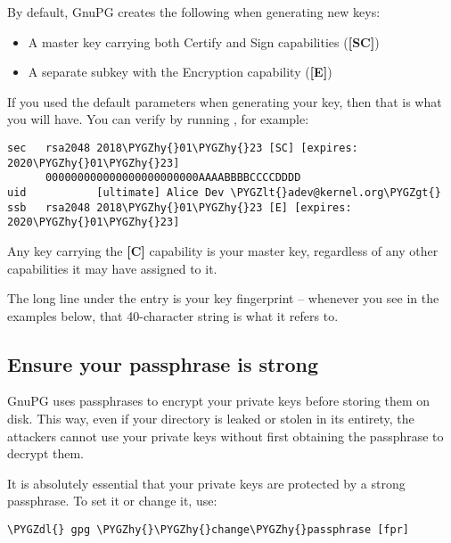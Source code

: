 \documentclass[a4paper,8pt,english]{sphinxmanual}
\def\PYGZlt{\char`\<}
\def\PYGZgt{\char`\>}
\def\PYGZdl{\char`\$}
\def\PYGZhy{\char`\-}
\begin{document}
By default, GnuPG creates the following when generating new keys:
\begin{itemize}
\item {} 
A master key carrying both Certify and Sign capabilities (\textbf{{[}SC{]}})

\item {} 
A separate subkey with the Encryption capability (\textbf{{[}E{]}})

\end{itemize}

If you used the default parameters when generating your key, then that
is what you will have. You can verify by running ,
for example:

\begin{Verbatim}[commandchars=\\\{\}]
sec   rsa2048 2018\PYGZhy{}01\PYGZhy{}23 [SC] [expires: 2020\PYGZhy{}01\PYGZhy{}23]
      000000000000000000000000AAAABBBBCCCCDDDD
uid           [ultimate] Alice Dev \PYGZlt{}adev@kernel.org\PYGZgt{}
ssb   rsa2048 2018\PYGZhy{}01\PYGZhy{}23 [E] [expires: 2020\PYGZhy{}01\PYGZhy{}23]
\end{Verbatim}

Any key carrying the \textbf{{[}C{]}} capability is your master key, regardless
of any other capabilities it may have assigned to it.

The long line under the  entry is your key fingerprint --
whenever you see \code{{[}fpr{]}} in the examples below, that 40-character
string is what it refers to.


\subsection{Ensure your passphrase is strong}
\label{process/maintainer-pgp-guide:ensure-your-passphrase-is-strong}
GnuPG uses passphrases to encrypt your private keys before storing them on
disk. This way, even if your  directory is leaked or stolen in
its entirety, the attackers cannot use your private keys without first
obtaining the passphrase to decrypt them.

It is absolutely essential that your private keys are protected by a
strong passphrase. To set it or change it, use:

\begin{Verbatim}[commandchars=\\\{\}]
\PYGZdl{} gpg \PYGZhy{}\PYGZhy{}change\PYGZhy{}passphrase [fpr]
\end{Verbatim}
\end{document}
